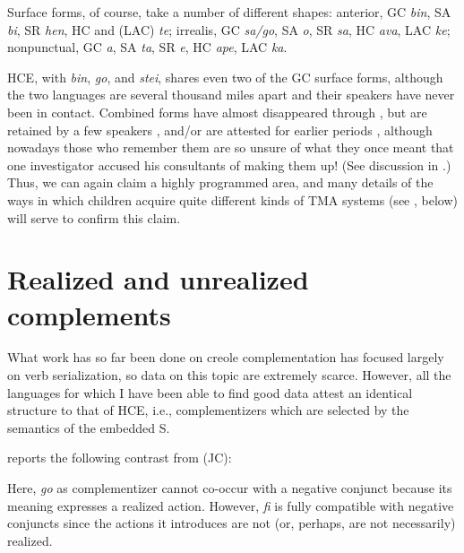 
Surface forms, of course, take a number of different shapes: 
anterior,
 GC \textit{bin}, 
 SA \textit{bi}, 
 SR \textit{hen}, 
 HC and  (LAC) \textit{te}; 
irrealis, 
 GC \textit{sa/go}, 
 SA \textit{o},
 SR \textit{sa}, 
 HC \textit{ava}, 
 LAC \textit{ke};
nonpunctual, 
 GC \textit{a}, 
 SA \textit{ta}, 
 SR \textit{e}, 
 HC \textit{ape}, 
 LAC \textit{ka}.

HCE, with \textit{bin}, \textit{go}, and \textit{stei}, shares even two of the GC surface forms, although the two languages are several thousand miles apart and their speakers have never been in contact. Combined forms have almost disappeared through , but are retained by a few speakers \citep{Bickerton1974}, and/or are attested for earlier periods \citep{Reinecke1969,Tsuzaki1971}, although nowadays those who remember them are so unsure of what they once meant that one investigator \citep{Perlman1973} accused his consultants of making them up! (See discussion in \citealt[183ff]{Bickerton1980}.) Thus, we can again claim a highly programmed area, and many details of the ways in which children acquire quite different kinds of TMA systems (see , below) will serve to confirm this claim.

\section{Realized and unrealized complements}

What work has so far been done on creole complementation has focused largely on verb serialization, so data on this topic are extremely scarce. However, all the languages for which I have been able to find good data attest an identical structure to that of HCE, i.e., complementizers which are selected by the semantics of the embedded S.

\citet{Roberts1975} reports the following contrast from  (JC):

\z

\label{ex:2:28}\z
Here, \textit{go} as complementizer cannot co-occur with a negative conjunct because its meaning expresses a realized action. However, \textit{fi} is fully
compatible with negative conjuncts since the actions it introduces are not (or, perhaps, are not necessarily) realized.

